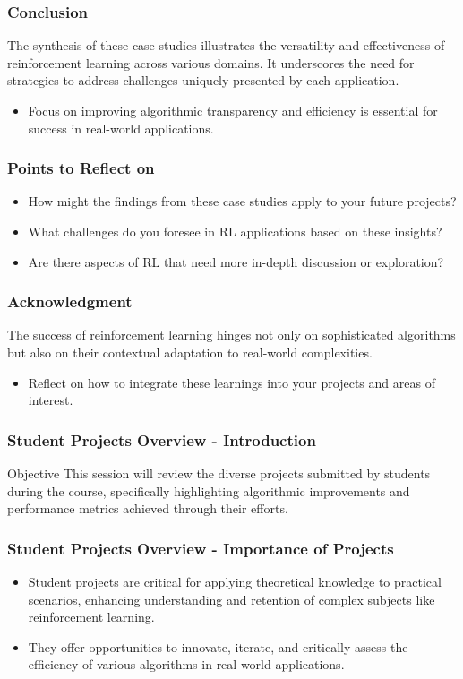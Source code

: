 \documentclass[aspectratio=169]{beamer}
\begin{document}
\begin{frame}[fragile]
    \frametitle{Conclusion}
    The synthesis of these case studies illustrates the versatility and effectiveness of reinforcement learning across various domains. It underscores the need for strategies to address challenges uniquely presented by each application. 
    \begin{itemize}
        \item Focus on improving algorithmic transparency and efficiency is essential for success in real-world applications.
    \end{itemize}
\end{frame}

\begin{frame}[fragile]
    \frametitle{Points to Reflect on}
    \begin{itemize}
        \item How might the findings from these case studies apply to your future projects?
        \item What challenges do you foresee in RL applications based on these insights?
        \item Are there aspects of RL that need more in-depth discussion or exploration?
    \end{itemize}
\end{frame}

\begin{frame}[fragile]
    \frametitle{Acknowledgment}
    The success of reinforcement learning hinges not only on sophisticated algorithms but also on their contextual adaptation to real-world complexities. 
    \begin{itemize}
        \item Reflect on how to integrate these learnings into your projects and areas of interest.
    \end{itemize}
\end{frame}

\begin{frame}[fragile]
    \frametitle{Student Projects Overview - Introduction}
    \begin{block}{Objective}
        This session will review the diverse projects submitted by students during the course, specifically highlighting algorithmic improvements and performance metrics achieved through their efforts.
    \end{block}
\end{frame}

\begin{frame}[fragile]
    \frametitle{Student Projects Overview - Importance of Projects}
    \begin{itemize}
        \item Student projects are critical for applying theoretical knowledge to practical scenarios, enhancing understanding and retention of complex subjects like reinforcement learning.
        \item They offer opportunities to innovate, iterate, and critically assess the efficiency of various algorithms in real-world applications.
    \end{itemize}
\end{frame}
\end{document}
